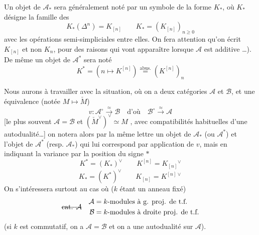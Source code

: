 \documentclass[11pt,a4paper]{article}
\begin{document}
Un objet de $\mathcal{A}_{*}$ sera généralement noté par un symbole de la forme
$K_{*}$, où $K_{*}$ désigne la famille des
\[
  K_{*}(\Delta^{n}) = K_{[n]} \qquad K_{*} = (K_{[n]})_{n \geqslant 0}
\]
 
avec les opérations semi-simpliciales entre elles. On fera attention qu'on écrit
$K_{[n]}$ et non $K_{n}$, pour des raisons qui vont apparaître 
lorsque $\mathcal{A}$ est additive …).
De même un objet de $\mathcal{A}^{*}$ sera noté
\[
  K^{*} = (n \longmapsto K^{[n]}) \overset{\text{abus.}}{=} (K^{[n]})_{n}
\]

Nous aurons à travailler avec la situation, où on a deux catégories $\mathcal{A}$ et
$\mathcal{B}$, et une équivalence (notée \struck{\ill{}} $M \mapsto \check{M}$)
\[
  v : \mathcal{A}^{\circ} \xrightarrow{\ \approx\ } \mathcal{B} \quad \text{d'où} \quad
  \mathcal{B}^{\circ} \xrightarrow{\ \approx\ } \mathcal{A}
\]
[le plus souvent $\mathcal{A} = \mathcal{B}$ et $(\check{M}^{\vee})^{\vee} \simeq M$
, avec compatibilités habituelles d'une autodualité…] on notera
alors  par la même lettre un objet de $\mathcal{A}_{*}$ (ou
$\mathcal{A}^{*}$) et l'objet de $\mathcal{A}^{*}$ (resp. $\mathcal{A}_{*}$) qui lui
correspond par application de $v$, mais en indiquant la variance par la position
du signe $*$
\[
  K^{*} = (K_{*})^{\vee} \qquad K^{[n]} = K_{[n]}{}^{\vee}
\]
\[
  K_{*} = (K^{*})^{\vee} \qquad K_{[n]} = K^{[n]\vee}
\]
On s'intéressera surtout au cas où ($k$ étant un anneau fixé) 
\[
  \text{\struck{cat. $\mathcal{A}$}} \quad
  \begin{aligned}
    \mathcal{A} &= k\text{-modules à g. proj. de t.f.} \\
    \mathcal{B} &= k\text{-modules à droite proj. de t.f.}
  \end{aligned}
\]
(si $k$ est commutatif, on a $\mathcal{A} = \mathcal{B}$ et on a une autodualité
sur $\mathcal{A}$).
\end{document}
